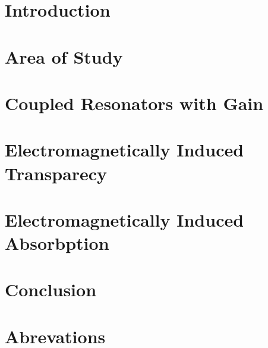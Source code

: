 \documentclass[12pt]{report}
\begin{document}
\begin{scriptsize}
\small \tableofcontents
\end{scriptsize}
\listoffigures
\newpage
{}


\chapter{Introduction}

 
\chapter{Area of Study}

 
\chapter{Coupled Resonators with Gain}

 
\chapter{Electromagnetically Induced Transparecy}

 
\chapter{Electromagnetically Induced Absorbption}


\chapter{Conclusion}

\appendix
\chapter{Abrevations}

\end{document}
